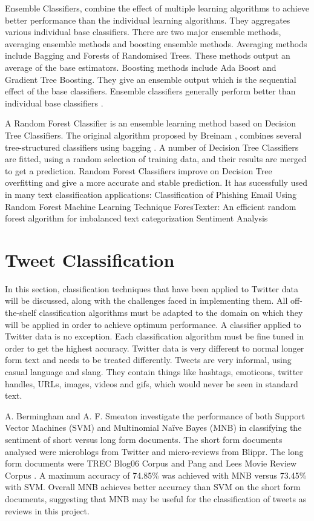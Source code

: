 Ensemble Classifiers, combine the effect of multiple learning algorithms to achieve better performance than the individual learning algorithms. They aggregates various individual base classifiers. There are two major ensemble methods, averaging ensemble methods and boosting ensemble methods. Averaging methods include Bagging and Forests of Randomised Trees. These methods output an average of the base estimators. Boosting methods include Ada Boost and Gradient Tree Boosting. They give an ensemble output which is the sequential effect of the base classifiers. Ensemble classifiers generally perform better than individual base classifiers \cite{Opitz1999}. 

A Random Forest Classifier is an ensemble learning method based on Decision Tree Classifiers. The original algorithm proposed by Breinam \cite{Breiman2001}, combines several tree-structured classifiers using bagging \cite{breiman1996bagging}. A number of Decision Tree Classifiers are fitted, using a random selection of training data, and their results are merged to get a prediction. Random Forest Classifiers improve on Decision Tree overfitting and give a more accurate and stable prediction. It has sucessfully used in many text classification applications:
Classification of Phishing Email Using Random Forest Machine
Learning Technique
ForesTexter: An efficient random forest algorithm for imbalanced text categorization
Sentiment Analysis

\section{Tweet Classification}

In this section, classification techniques that have been applied to Twitter data will be discussed, along with the challenges faced in implementing them. All off-the-shelf classification algorithms must be adapted to the domain on which they will be applied in order to achieve optimum performance. A classifier applied to Twitter data is no exception. Each classification algorithm must be fine tuned in order to get the highest accuracy. Twitter data is very different to normal longer form text and needs to be treated differently. Tweets are very informal, using casual language and slang. They contain things like hashtags, emoticons, twitter handles, URLs, images, videos and gifs, which would never be seen in standard text.

A. Bermingham and A. F. Smeaton \cite{Berm2010} investigate the performance of both Support Vector Machines (SVM) and Multinomial Naïve Bayes (MNB) in classifying the sentiment of short versus long form documents. The short form documents analysed were microblogs from Twitter and micro-reviews from Blippr. The long form documents were TREC Blog06 Corpus and Pang and Lees Movie Review Corpus \cite{panglee2004}. A maximum accuracy of 74.85\% was achieved with MNB versus 73.45\% with SVM. Overall MNB achieves better accuracy than SVM on the short form documents, suggesting that MNB may be useful for the classification of tweets as reviews in this project.

